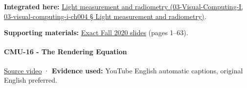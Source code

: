 \textbf{Integrated here:} \href{}{Light measurement and radiometry (03-Visual-Computing-I, 03-visual-computing-i-ch004 § Light measurement and radiometry)}.

\textbf{Supporting materials:} \href{https://15462.courses.cs.cmu.edu/fall2020content/lectures/15_radiometry/15_radiometry_slides.pdf}{Exact Fall 2020 slides} (pages 1--63).

\paragraph{CMU-16 - The Rendering Equation}\label{cmu-16---the-rendering-equation}

\href{https://www.youtube.com/watch?v=Ttxdbn7TSLI}{Source video} · \textbf{Evidence used:} YouTube English automatic captions, original English preferred.

